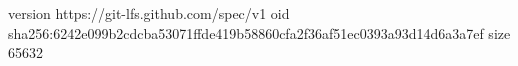 version https://git-lfs.github.com/spec/v1
oid sha256:6242e099b2cdcba53071ffde419b58860cfa2f36af51ec0393a93d14d6a3a7ef
size 65632
